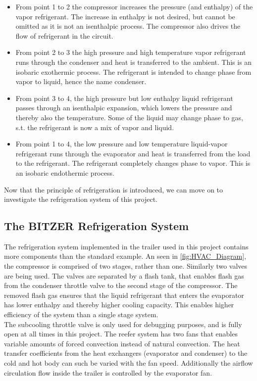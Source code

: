 \begin{itemize}
	\item From point 1 to 2 the compressor increases the pressure (and enthalpy) of the vapor refrigerant. The increase in enthalpy is not desired, but cannot be omitted as it is not an isenthalpic process. The compressor also drives the flow of refrigerant in the circuit.
	\item From point 2 to 3 the high pressure and high temperature vapor refrigerant runs through the condenser and heat is transferred to the ambient. This is an isobaric exothermic process. The refrigerant is intended to change phase from vapor to liquid, hence the name condenser.
	\item From point 3 to 4, the high pressure but low enthalpy liquid refrigerant passes through an isenthalpic expansion, which lowers the pressure and thereby also the temperature. Some of the liquid may change phase to gas, s.t. the refrigerant is now a mix of vapor and liquid.
	\item From point 1 to 4, the low pressure and low temperature liquid-vapor refrigerant runs through the evaporator and heat is transferred from the load to the refrigerant. The refrigerant completely changes phase to vapor. This is an isobaric endothermic process. 
\end{itemize}
 Now that the principle of refrigeration is introduced, we can move on to investigate the refrigeration system of this project. 
 
\subsection{The BITZER Refrigeration System}
The refrigeration system implemented in the trailer used in this project contains more components than the standard example. An seen in \cref{fig:HVAC_Diagram}, the compressor is comprised of two stages, rather than one. Similarly two valves are being used. The valves are separated by a flash tank, that enables flash gas from the condenser throttle valve to the second stage of the compressor. The removed flash gas ensures that the liquid refrigerant that enters the evaporator has lower enthalpy and thereby higher cooling capacity. This enables higher efficiency of the system than a single stage system.\\
The subcooling throttle valve is only used for debugging purposes, and is fully open at all times in this project. The reefer system has two fans that enables variable amounts of forced convection instead of natural convection. The heat transfer coefficients from the heat exchangers (evaporator and condenser) to the cold and hot body can such be varied with the fan speed. Additionally the airflow circulation flow inside the trailer is controlled by the evaporator fan.

